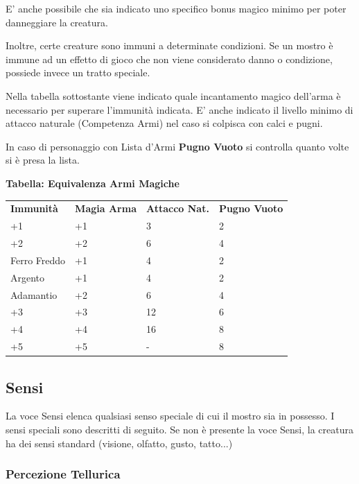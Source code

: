 \begin{multicols}{2}
	E' anche possibile che sia indicato uno specifico bonus magico minimo per poter danneggiare la creatura.

	Inoltre, certe creature sono immuni a determinate condizioni. Se un mostro è immune ad un effetto di gioco che non viene considerato danno o condizione, possiede invece un tratto speciale.

	Nella tabella sottostante viene indicato quale incantamento magico dell'arma è necessario per superare l'immunità indicata. E' anche indicato il livello minimo di attacco naturale  (Competenza Armi) nel caso si colpisca con calci e pugni.

	In caso di personaggio con Lista d'Armi \textbf{Pugno Vuoto} si controlla quanto volte si è presa la lista.

	\medskip

	\textbf{Tabella: Equivalenza Armi Magiche}\hypertarget{equivalenzemagiche}{}\label{equivalenzaarmimagiche}

	\medskip

	\begin{tabular}{lp{}p{}p{}}
		\toprule
		\textbf{Immunità} & \textbf{Magia Arma} & \textbf{Attacco Nat.}& \textbf{Pugno Vuoto}\\
		+1      	   	& +1     &  3&  2\\
		+2         		& +2     &  6&  4\\
		Ferro Freddo 	& +1     &  4&  2\\
		Argento  		& +1     &  4&  2\\
		Adamantio       & +2     &  6&  4\\
		+3      		& +3     &  12& 6\\
		+4        	 	& +4     &  16& 8\\
		+5        	 	& +5     & - &  8\\
	\end{tabular}

	\subsection{Sensi}

	La voce Sensi elenca qualsiasi senso speciale di cui il mostro sia in possesso. I sensi speciali sono descritti di seguito. Se non è presente la voce Sensi, la creatura ha dei sensi standard (visione, olfatto, gusto, tatto...)

	\subsubsection{Percezione Tellurica}


\end{multicols}

